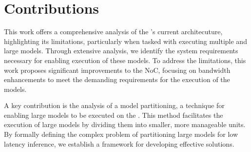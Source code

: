 \section{Contributions}


This work offers a comprehensive analysis of the \graicore{}'s current architecuture, highlighting its limitations, particularly when tasked with executing multiple and large models.
Through extensive analysis, we identify the system requirements necessary for enabling execution of these models.
To address the limitations, this work proposes significant improvements to the NoC, focusing on bandwidth enhancements to meet the demanding requirements for the execution of the models.

A key contribution is the analysis of a model partitioning, a technique for enabling large models to be executed on the \graicore{}.
This method facilitates the execution of large models by dividing them into smaller, more manageable units.
By formally defining the complex problem of partitioning large models for low latency inference, we establish a framework for developing effective solutions.

